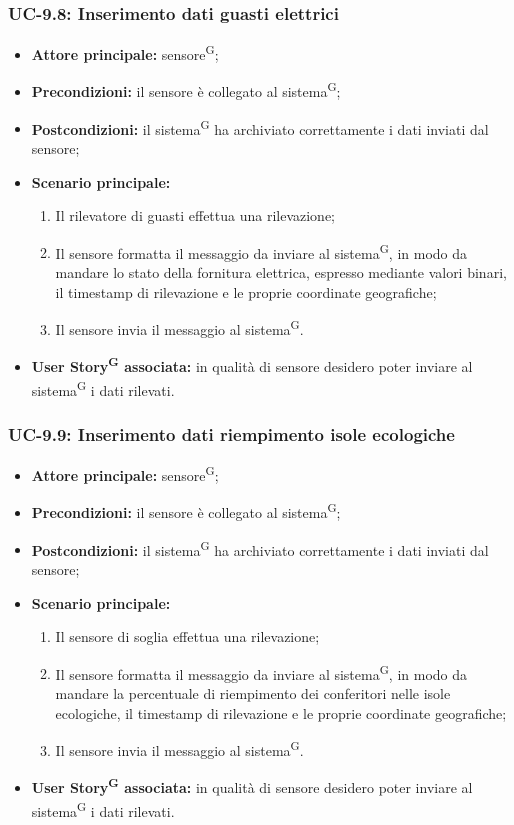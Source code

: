 \documentclass[8pt]{article}
\newcommand{\glossterm}[1]{#1\textsuperscript{G}} %
\begin{document}
\subsubsection*{UC-9.8: Inserimento dati guasti elettrici}
\begin{itemize}
    \item \textbf{Attore principale:} \glossterm{sensore};
    \item \textbf{Precondizioni:} il sensore è collegato al \glossterm{sistema};
    \item \textbf{Postcondizioni:} il \glossterm{sistema} ha archiviato correttamente i dati inviati dal sensore;
    \item \textbf{Scenario principale:}
        \begin{enumerate}
        \item Il rilevatore di guasti effettua una rilevazione;
        \item Il sensore formatta il messaggio da inviare al \glossterm{sistema}, in modo da mandare lo stato della fornitura elettrica, espresso mediante valori binari, il timestamp di rilevazione e le proprie coordinate geografiche;
        \item Il sensore invia il messaggio al \glossterm{sistema}.
        \end{enumerate}
    \item \textbf{\glossterm{User Story} associata:} in qualità di sensore desidero poter inviare al \glossterm{sistema} i dati rilevati.
\end{itemize}
\subsubsection*{UC-9.9: Inserimento dati riempimento isole ecologiche}
\begin{itemize}
    \item \textbf{Attore principale:} \glossterm{sensore};
    \item \textbf{Precondizioni:} il sensore è collegato al \glossterm{sistema};
    \item \textbf{Postcondizioni:} il \glossterm{sistema} ha archiviato correttamente i dati inviati dal sensore;
    \item \textbf{Scenario principale:}
        \begin{enumerate}
        \item Il sensore di soglia effettua una rilevazione;
        \item Il sensore formatta il messaggio da inviare al \glossterm{sistema}, in modo da mandare la percentuale di riempimento dei conferitori nelle isole ecologiche, il timestamp di rilevazione e le proprie coordinate geografiche;
        \item Il sensore invia il messaggio al \glossterm{sistema}.
        \end{enumerate}
    \item \textbf{\glossterm{User Story} associata:} in qualità di sensore desidero poter inviare al \glossterm{sistema} i dati rilevati.
\end{itemize}
\end{document}
